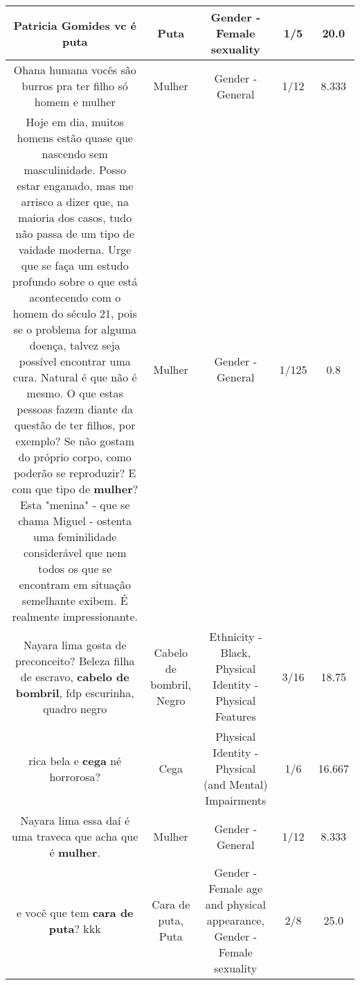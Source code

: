 \documentclass[11pt]{article}
\newlength\mylength
\begin{document}
\begin{center}
\begin{longtable}{|C{.65\mylength}|C{.30\mylength}|C{.12\mylength}|C{.12\mylength}|C{.12\mylength}|}
  \small Patricia Gomides vc é puta\normalsize   & Puta & Gender - Female sexuality & 1/5 & 20.0 \\  \hline
  \small Ohana humana vocês são burros pra ter filho só homem e mulher\normalsize   & Mulher & Gender - General & 1/12 & 8.333 \\  \hline
  \small Hoje em dia, muitos homens estão quase que nascendo sem masculinidade. Posso estar enganado, mas me arrisco a dizer que, na maioria dos casos, tudo não passa de um tipo de vaidade moderna. Urge que se faça um estudo profundo sobre o que está acontecendo com o homem do século 21, pois se o problema for alguma doença, talvez seja possível encontrar uma cura. Natural é que não é mesmo. O que estas pessoas fazem diante da questão de ter filhos, por exemplo? Se não gostam do próprio corpo, como poderão se reproduzir? E com que tipo de \textbf{mulher}? Esta "menina" - que se chama Miguel - ostenta uma feminilidade considerável que nem todos os que se encontram em situação semelhante exibem. É realmente impressionante.\normalsize   & Mulher & Gender - General & 1/125 & 0.8 \\  \hline
  \small Nayara lima gosta de preconceito? Beleza filha de escravo, \textbf{c\textbf{abelo de bombril}}, fdp escurinha, quadro negro\normalsize   & Cabelo de bombril, Negro & Ethnicity - Black, Physical Identity - Physical Features & 3/16 & 18.75 \\  \hline
  \small rica bela e \textbf{cega} né horrorosa?\normalsize   & Cega & Physical Identity - Physical (and Mental) Impairments & 1/6 & 16.667 \\  \hline
  \small Nayara lima essa daí é uma traveca que acha que é \textbf{mulher}.\normalsize   & Mulher & Gender - General & 1/12 & 8.333 \\  \hline
  \small e você que tem \textbf{cara de p\textbf{uta}}? kkk\normalsize   & Cara de puta, Puta & Gender - Female age and physical appearance, Gender - Female sexuality & 2/8 & 25.0 \\  \hline

\end{longtable}
\end{center}
\end{document}
